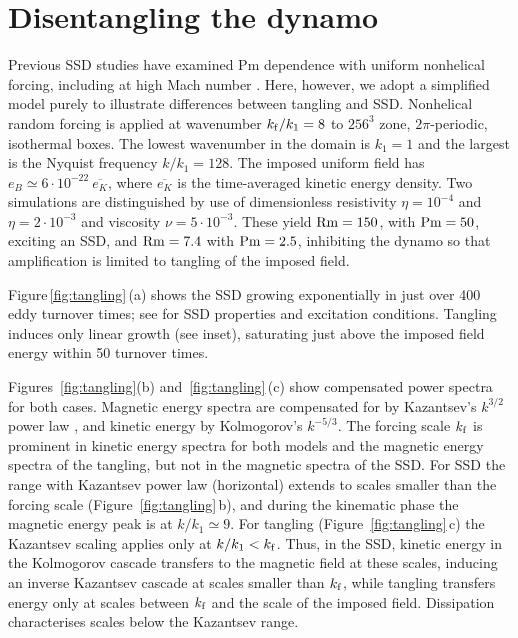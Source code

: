 \documentclass[preprint2]{aastex63}
\newcommand\Rm{{\rm Rm} }
\newcommand\Pm{{\rm Pm} }
\newcommand\kf{k_{\rm f} }
\newcommand{\fg}[1]{\textcolor{midgreen}{#1}}
\newcommand{\mm}[1]{\textcolor{mypurple}{#1}}
\begin{document}
\section{Disentangling the dynamo} \label{sec:ssd-tang}

 \fg{Previous SSD studies have examined Pm dependence with \mm{uniform}
 nonhelical forcing, including \mm{at} high Mach number \citep[e.g.,][]{ 
 HBD03,HBD04,Haugen:2004M,FCSBKS11,FSBS14}.}
 \fg{Here, however, we adopt a simplified model purely t}o illustrate
 differences between tangling and SSD.
 Nonhelical random forcing is applied at wavenumber $\kf/k_1=8$ to
 $256^3$ zone, $2\pi$-periodic, isothermal boxes.
 The lowest wavenumber in the domain is $k_1=1$ and the largest is the Nyquist
 frequency $k/k_1 = 128$.
 The imposed uniform field has $e_B\simeq6\cdot10^{-22}~\overline{e_K}$, where
 $\overline{e_K}$ is the time-averaged kinetic energy density.
 Two simulations are distinguished by use of dimensionless
 resistivity $\eta=10^{-4}$
 and $\eta=2\cdot10^{-3}$ and viscosity $\nu=5\cdot10^{-3}$.
 These yield $\Rm=150$, with $\Pm = 50$, exciting \mm{an} SSD, and $\Rm=7.4$ with
 $\Pm=2.5$, inhibiting the dynamo so that amplification is limited to tangling
 of the imposed field.

 Figure\,\ref{fig:tangling}\,(a) shows the SSD growing exponentially in just over
 400 eddy turnover times; see \cite{ZRS83} for SSD properties and excitation
 conditions.
 Tangling induces only linear growth (see inset), saturating just above
 the imposed field energy within 50 turnover times.

 \mm{Figures~\ref{fig:tangling}(b) and~\ref{fig:tangling}\,(c) show
   compensated power spectra for both cases.}
 Magnetic energy spectra are compensated \mm{for by} Kazantsev's $k^{3/2}$
 \fg{power law} \citep{Sch02,BS14}, and kinetic energy \mm{by}
 Kolmogorov's $k^{-5/3}$.
 The forcing scale $\kf$ is
 \mm{prominent} in kinetic
 energy \fg{spectra for both models} and the magnetic energy \fg{spectra of
 the tangling}, but \mm{not}
 \fg{in the magnetic spectra of the SSD}.
 \fg{For SSD the range with Kazantsev power law (horizontal) extends to scales
 smaller than the forcing scale (Figure~\ref{fig:tangling}\,b), and during the
 kinematic phase the magnetic energy peak is at $k/k_1\simeq9$.}
\fg{For tangling (Figure~\ref{fig:tangling}\,c) the Kazantsev
  \mm{scaling} applies
only at $k/k_1<\kf$.} 
Thus, in the SSD, kinetic energy
     \mm{in the Kolmogorov cascade}
transfers to the magnetic field at these scales, inducing an inverse Kazantsev \fg{cascade}
 at scales \fg{smaller than} $\kf$, while tangling transfers energy only at
 scales between
 $\kf$ and the scale of the imposed field.
 Dissipation \fg{characterises} scales below the Kazantsev range.
 
\end{document}
